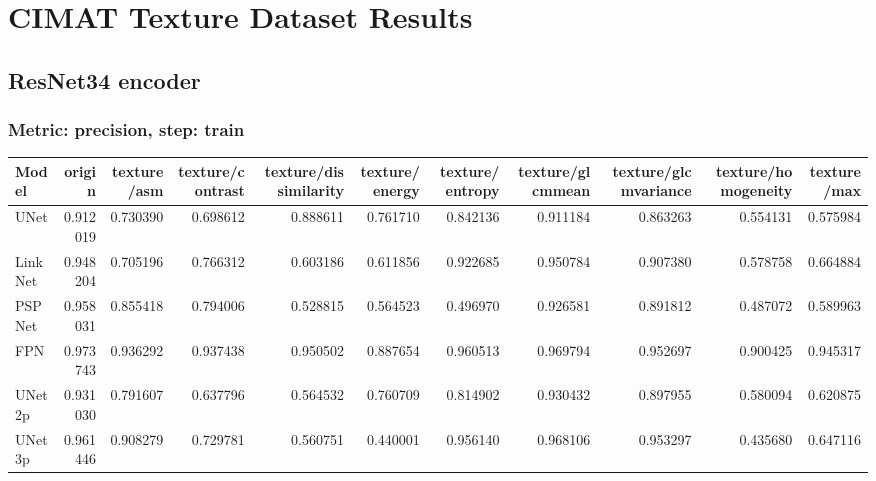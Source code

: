 \documentclass{article}
\begin{document}
\section{CIMAT Texture Dataset Results}

\subsection{ResNet34 encoder}
\subsubsection{Metric: precision, step: train}
\begin{tabular}{lrrrrrrrrrr}
\toprule
Model & origin & texture/asm & texture/contrast & texture/dissimilarity & texture/energy & texture/entropy & texture/glcmmean & texture/glcmvariance & texture/homogeneity & texture/max \\
\midrule
UNet & 0.912019 & 0.730390 & 0.698612 & 0.888611 & 0.761710 & 0.842136 & 0.911184 & 0.863263 & 0.554131 & 0.575984 \\
LinkNet & 0.948204 & 0.705196 & 0.766312 & 0.603186 & 0.611856 & 0.922685 & 0.950784 & 0.907380 & 0.578758 & 0.664884 \\
PSPNet & 0.958031 & 0.855418 & 0.794006 & 0.528815 & 0.564523 & 0.496970 & 0.926581 & 0.891812 & 0.487072 & 0.589963 \\
FPN & 0.973743 & 0.936292 & 0.937438 & 0.950502 & 0.887654 & 0.960513 & 0.969794 & 0.952697 & 0.900425 & 0.945317 \\
UNet2p & 0.931030 & 0.791607 & 0.637796 & 0.564532 & 0.760709 & 0.814902 & 0.930432 & 0.897955 & 0.580094 & 0.620875 \\
UNet3p & 0.961446 & 0.908279 & 0.729781 & 0.560751 & 0.440001 & 0.956140 & 0.968106 & 0.953297 & 0.435680 & 0.647116 \\
\bottomrule
\end{tabular}
\end{document}
